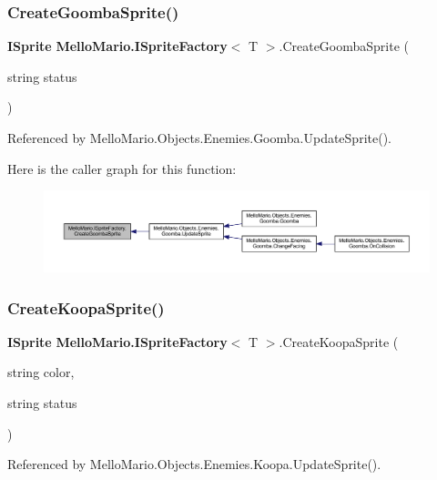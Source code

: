 \subsubsection{Create\+Goomba\+Sprite()}
{\footnotesize\ttfamily \textbf{ I\+Sprite} \textbf{ Mello\+Mario.\+I\+Sprite\+Factory}$<$ T $>$.Create\+Goomba\+Sprite (\begin{DoxyParamCaption}\item[{string}]{status }\end{DoxyParamCaption})}



Referenced by Mello\+Mario.\+Objects.\+Enemies.\+Goomba.\+Update\+Sprite().

Here is the caller graph for this function\+:
\nopagebreak
\begin{figure}[H]
\begin{center}
\leavevmode
\includegraphics[width=350pt]{interfaceMelloMario_1_1ISpriteFactory_acbcfc2b85fb60239b6a77360ec4e5293_icgraph}
\end{center}
\end{figure}
\mbox{\label{interfaceMelloMario_1_1ISpriteFactory_aac5bcc36a5f7b692b4f6cbbd0d261240}} 
\subsubsection{Create\+Koopa\+Sprite()}
{\footnotesize\ttfamily \textbf{ I\+Sprite} \textbf{ Mello\+Mario.\+I\+Sprite\+Factory}$<$ T $>$.Create\+Koopa\+Sprite (\begin{DoxyParamCaption}\item[{string}]{color,  }\item[{string}]{status }\end{DoxyParamCaption})}



Referenced by Mello\+Mario.\+Objects.\+Enemies.\+Koopa.\+Update\+Sprite().

